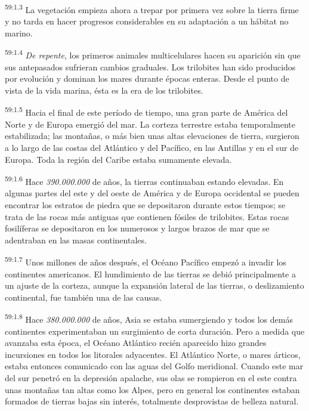 \par
\textsuperscript{59:1.3} La vegetación empieza ahora a trepar por primera vez sobre la tierra firme y no tarda en hacer progresos considerables en su adaptación a un hábitat no marino.

\par
\textsuperscript{59:1.4} \textit{De repente}, los primeros animales multicelulares hacen su aparición sin que sus antepasados sufrieran cambios graduales. Los trilobites han sido producidos por evolución y dominan los mares durante épocas enteras. Desde el punto de vista de la vida marina, ésta es la era de los trilobites.

\par
\textsuperscript{59:1.5} Hacia el final de este período de tiempo, una gran parte de América del Norte y de Europa emergió del mar. La corteza terrestre estaba temporalmente estabilizada; las montañas, o más bien unas altas elevaciones de tierra, surgieron a lo largo de las costas del Atlántico y del Pacífico, en las Antillas y en el sur de Europa. Toda la región del Caribe estaba sumamente elevada.

\par
\textsuperscript{59:1.6} Hace \textit{390.000.000} de años, la tierras continuaban estando elevadas. En algunas partes del este y del oeste de América y de Europa occidental se pueden encontrar los estratos de piedra que se depositaron durante estos tiempos; se trata de las rocas más antiguas que contienen fósiles de trilobites. Estas rocas fosilíferas se depositaron en los numerosos y largos brazos de mar que se adentraban en las masas continentales.

\par
\textsuperscript{59:1.7} Unos millones de años después, el Océano Pacífico empezó a invadir los continentes americanos. El hundimiento de las tierras se debió principalmente a un ajuste de la corteza, aunque la expansión lateral de las tierras, o deslizamiento continental, fue también una de las causas.

\par
\textsuperscript{59:1.8} Hace \textit{380.000.000} de años, Asia se estaba sumergiendo y todos los demás continentes experimentaban un surgimiento de corta duración. Pero a medida que avanzaba esta época, el Océano Atlántico recién aparecido hizo grandes incursiones en todos los litorales adyacentes. El Atlántico Norte, o mares árticos, estaba entonces comunicado con las aguas del Golfo meridional. Cuando este mar del sur penetró en la depresión apalache, sus olas se rompieron en el este contra unas montañas tan altas como los Alpes, pero en general los continentes estaban formados de tierras bajas sin interés, totalmente desprovistas de belleza natural.

